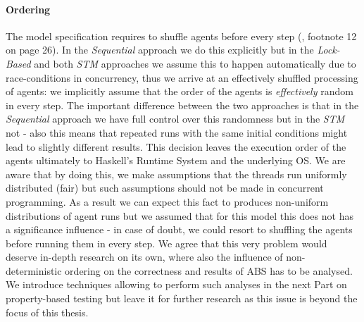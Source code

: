 \paragraph{Ordering} The model specification requires to shuffle agents before every step (\cite{epstein_growing_1996}, footnote 12 on page 26). In the \textit{Sequential} approach we do this explicitly but in the \textit{Lock-Based} and both \textit{STM} approaches we assume this to happen automatically due to race-conditions in concurrency, thus we arrive at an effectively shuffled processing of agents: we implicitly assume that the order of the agents is \textit{effectively} random in every step. The important difference between the two approaches is that in the \textit{Sequential} approach we have full control over this randomness but in the \textit{STM} not - also this means that repeated runs with the same initial conditions might lead to slightly different results. 
This decision leaves the execution order of the agents ultimately to Haskell's Runtime System and the underlying OS. We are aware that by doing this, we make assumptions that the threads run uniformly distributed (fair) but such assumptions should not be made in concurrent programming. As a result we can expect this fact to produces non-uniform distributions of agent runs but we assumed that for this model this does not has a significance influence - in case of doubt, we could resort to shuffling the agents before running them in every step. We agree that this very problem would deserve in-depth research on its own, where also the influence of non-deterministic ordering on the correctness and results of ABS has to be analysed. We introduce techniques allowing to perform such analyses in the next Part on property-based testing but leave it for further research as this issue is beyond the focus of this thesis.


